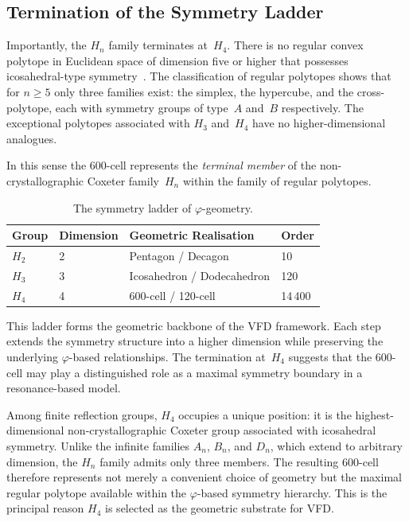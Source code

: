 \documentclass[12pt,a4paper]{article}
\newcommand{\Hfour}{H_4}
\newcommand{\Hthree}{H_3}
\newcommand{\Htwo}{H_2}
\newcommand{\vphi}{\varphi}
\begin{document}
\subsection{Termination of the Symmetry Ladder}

Importantly, the $H_n$ family terminates at~$\Hfour$.  There is no regular
convex polytope in Euclidean space of dimension five or higher that possesses
icosahedral-type symmetry~\cite{mcmullen2002}.  The classification of regular
polytopes shows that for $n \ge 5$ only three families exist: the simplex, the
hypercube, and the cross-polytope, each with symmetry groups of type~$A$
and~$B$ respectively.  The exceptional polytopes associated with $\Hthree$
and~$\Hfour$ have no higher-dimensional analogues.

In this sense the 600-cell represents the \emph{terminal member} of the
non-crystallographic Coxeter family~$H_n$ within the family of regular
polytopes.

\begin{table}[H]
\centering
\caption{The symmetry ladder of $\vphi$-geometry.}
\label{tab:ladder}
\begin{tabular}{@{}llll@{}}
\toprule
Group & Dimension & Geometric Realisation & Order \\
\midrule
$\Htwo$ & 2 & Pentagon / Decagon & 10 \\
$\Hthree$ & 3 & Icosahedron / Dodecahedron & 120 \\
$\Hfour$ & 4 & 600-cell / 120-cell & 14\,400 \\
\bottomrule
\end{tabular}
\end{table}

This ladder forms the geometric backbone of the VFD framework.  Each step
extends the symmetry structure into a higher dimension while preserving the
underlying $\vphi$-based relationships.  The termination at~$\Hfour$ suggests
that the 600-cell may play a distinguished role as a maximal symmetry boundary
in a resonance-based model.

Among finite reflection groups, $\Hfour$ occupies a unique position: it is the
highest-dimensional non-crystallographic Coxeter group associated with
icosahedral symmetry.  Unlike the infinite families $A_n$, $B_n$, and $D_n$,
which extend to arbitrary dimension, the $H_n$ family admits only three
members.  The resulting 600-cell therefore represents not merely a convenient
choice of geometry but the maximal regular polytope available within the
$\vphi$-based symmetry hierarchy.  This is the principal reason $\Hfour$ is
selected as the geometric substrate for VFD\@.
\end{document}

